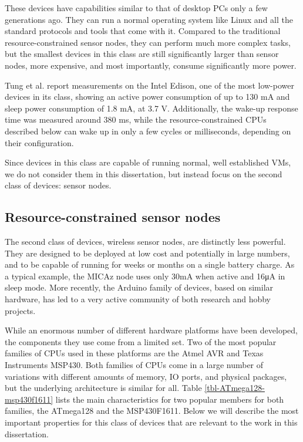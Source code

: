 These devices have capabilities similar to that of desktop PCs only a few generations ago. They can run a normal operating system like Linux and all the standard protocols and tools that come with it. Compared to the traditional resource-constrained sensor nodes, they can perform much more complex tasks, but the smallest devices in this class are still significantly larger than sensor nodes, more expensive, and most importantly, consume significantly more power.

Tung et al. \cite{Tung:2017tn} report measurements on the Intel Edison, one of the most low-power devices in its class, showing an active power consumption of up to 130 mA and sleep power consumption of 1.8 mA, at 3.7 V. Additionally, the wake-up response time was measured around 380 ms, while the resource-constrained CPUs described below can wake up in only a few cycles or milliseconds, depending on their configuration.

Since devices in this class are capable of running normal, well established VMs, we do not consider them in this dissertation, but instead focus on the second class of devices: sensor nodes.

\subsection{Resource-constrained sensor nodes}
The second class of devices, wireless sensor nodes, are distinctly less powerful. They are designed to be deployed at low cost and potentially in large numbers, and to be capable of running for weeks or months on a single battery charge. As a typical example, the MICAz node \cite{CrossbowTechnology} uses only 30mA when active and 16μA in sleep mode. More recently, the Arduino family of devices, based on similar hardware, has led to a very active community of both research and hobby projects.

While an enormous number of different hardware platforms have been developed, the components they use come from a limited set. Two of the most popular families of CPUs used in these platforms are the Atmel AVR and Texas Instruments MSP430. Both families of CPUs come in a large number of variations with different amounts of memory, IO ports, and physical packages, but the underlying architecture is similar for all. Table \ref{tbl-ATmega128-msp430f1611} lists the main characteristics for two popular members for both families, the ATmega128 and the MSP430F1611. Below we will describe the most important properties for this class of devices that are relevant to the work in this dissertation.

